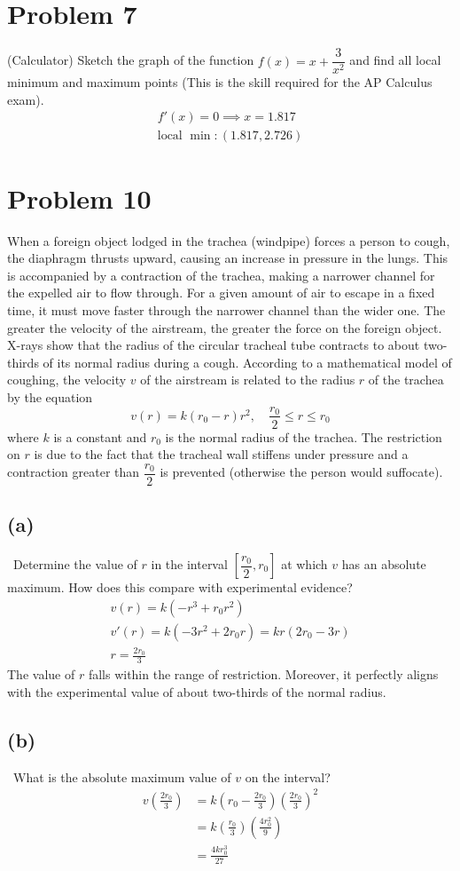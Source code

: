 \documentclass[12pt]{article}
\newcommand{\vem}{\vspace{0.5em}}
\newcommand{\problem}[1]{\section{Problem #1}}
\newcommand{\subproblem}[1]{\subsection{(#1)} \,}
\begin{document}
\problem{7} \vspace{-0.5em}
(Calculator) Sketch the graph of the function $f(x)=x+\dfrac{3}{x^2}$ and find all local minimum and maximum points (This is the skill required for the AP Calculus exam).
\begin{gather*}
    f'(x)=0 \implies x=1.817\\
    \boxed{\text{local }\min :(1.817,2.726) }
\end{gather*}

\problem{10}
When a foreign object lodged in the trachea (windpipe) forces a person to cough, the diaphragm thrusts upward, causing an increase in pressure in the lungs. This is accompanied by a contraction of the trachea, making a narrower channel for the expelled air to flow through. For a given amount of air to escape in a fixed time, it must move faster through the narrower channel than the wider one. The greater the velocity of the airstream, the greater the force on the foreign object. X-rays show that the radius of the circular tracheal tube contracts to about two-thirds of its normal radius during a cough. According to a mathematical model of coughing, the velocity $v$ of the airstream is related to the radius $r$ of the trachea by the equation
\[
v(r) = k(r_0 - r)r^2, \quad \frac{r_0}{2} \le r \le r_0
\]
where $k$ is a constant and $r_0$ is the normal radius of the trachea. The restriction on $r$ is due to the fact that the tracheal wall stiffens under pressure and a contraction greater than $\dfrac{r_0}{2}$ is prevented (otherwise the person would suffocate). \vem

\subproblem{a} Determine the value of $r$ in the interval $\left[ \dfrac{r_0}{2}, r_0\right]$ at which $v$ has an absolute maximum. How does this compare with experimental evidence?
\begin{gather*}
    v(r)=k(-r^3+r_0r^2)\\
    v'(r)=k(-3r^2+2r_0r)=kr(2r_0-3r)\\
    \boxed{r=\frac{2r_0}{3}}
\end{gather*}
The value of $r$ falls within the range of restriction. Moreover, it perfectly aligns with the experimental value of about two-thirds of the normal radius. 

\subproblem{b} What is the absolute maximum value of $v$ on the interval?
\begin{align*}
    v(\frac{2r_0}{3})&=k(r_0-\frac{2r_0}{3})(\frac{2r_0}{3})^2\\
    &=k(\frac{r_0}{3})(\frac{4r_0^2}{9})\\
    &=\boxed{\frac{4kr_0^3}{27}}
\end{align*}
\end{document}
